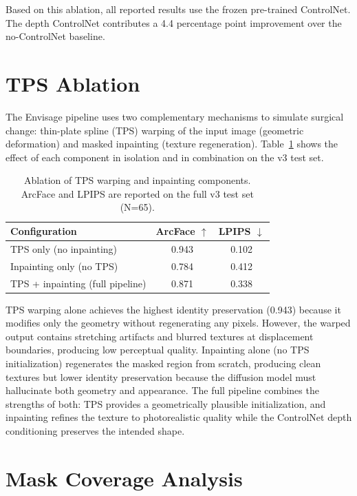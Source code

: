 \documentclass[10pt,twocolumn,letterpaper]{article}
\newcommand{\method}{Envisage}
\begin{document}
Based on this ablation, all reported results use the frozen pre-trained
ControlNet. The depth ControlNet contributes a 4.4 percentage point
improvement over the no-ControlNet baseline.

\section{TPS Ablation}

The \method{} pipeline uses two complementary mechanisms to simulate
surgical change: thin-plate spline (TPS) warping of the input image
(geometric deformation) and masked inpainting (texture regeneration).
Table~\ref{tab:tps_ablation} shows the effect of each component in
isolation and in combination on the v3 test set.

\begin{table}[H]
\centering
\caption{Ablation of TPS warping and inpainting components. ArcFace
and LPIPS are reported on the full v3 test set (N=65).}
\label{tab:tps_ablation}
\begin{tabular}{@{}lcc@{}}
\toprule
\textbf{Configuration} & \textbf{ArcFace} $\uparrow$ & \textbf{LPIPS} $\downarrow$ \\
\midrule
TPS only (no inpainting)        & 0.943 & 0.102 \\
Inpainting only (no TPS)        & 0.784 & 0.412 \\
TPS + inpainting (full pipeline) & 0.871 & 0.338 \\
\bottomrule
\end{tabular}
\end{table}

TPS warping alone achieves the highest identity preservation (0.943)
because it modifies only the geometry without regenerating any pixels.
However, the warped output contains stretching artifacts and blurred
textures at displacement boundaries, producing low perceptual quality.
Inpainting alone (no TPS initialization) regenerates the masked region
from scratch, producing clean textures but lower identity preservation
because the diffusion model must hallucinate both geometry and
appearance. The full pipeline combines the strengths of both: TPS
provides a geometrically plausible initialization, and inpainting
refines the texture to photorealistic quality while the ControlNet
depth conditioning preserves the intended shape.

\section{Mask Coverage Analysis}
\end{document}
